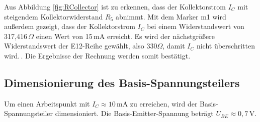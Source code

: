 Aus Abbildung \ref{fig:RCollector} ist zu erkennen, dass der Kollektorstrom $I_C$ mit steigendem Kollektorwiderstand $R_5$ abnimmt. Mit dem Marker m1 wird außerdem
gezeigt, dass der Kollektorstrom $I_C$ bei einem Widerstandswert von 317{,}416\,\(\Omega\) einen Wert von 15\,mA erreicht. Es wird der nächstgrößere Widerstandswert der E12-Reihe gewählt, also 330\(\Omega\), damit $I_C$ nicht überschritten wird.\,.
Die Ergebnisse der Rechnung werden somit bestätigt.

\subsection{Dimensionierung des Basis-Spannungsteilers}


Um einen Arbeitspunkt mit $I_C \approx 10\,\mathrm{mA}$ zu erreichen, wird der Basis-Spannungsteiler dimensioniert. Die Basis-Emitter-Spannung beträgt $U_{BE} \approx 0{,}7\,\mathrm{V}$.

%
%
%
%
%
%

